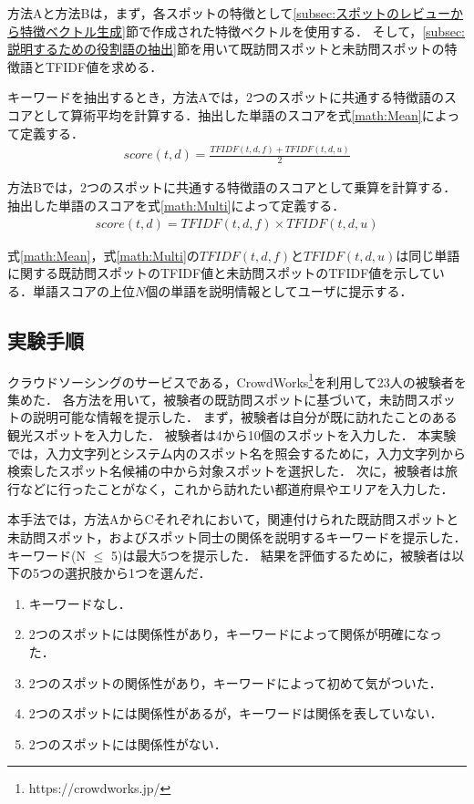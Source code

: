 \documentclass[submit]{ipsj}
\begin{document}
方法Aと方法Bは，まず，各スポットの特徴として\ref{subsec:スポットのレビューから特徴ベクトル生成}節で作成された特徴ベクトルを使用する．
そして，\ref{subsec:説明するための役割語の抽出}節を用いて既訪問スポットと未訪問スポットの特徴語とTFIDF値を求める．

キーワードを抽出するとき，方法Aでは，2つのスポットに共通する特徴語のスコアとして算術平均を計算する．抽出した単語のスコアを式\ref{math:Mean}によって定義する．
\begin{eqnarray}
  score(t,d) = \frac{TFIDF(t,d,f) + TFIDF(t,d,u)}{2}
  \label{math:Mean}
\end{eqnarray}

方法Bでは，2つのスポットに共通する特徴語のスコアとして乗算を計算する．抽出した単語のスコアを式\ref{math:Multi}によって定義する．
\begin{eqnarray}
  score(t,d) = TFIDF(t,d,f) \times TFIDF(t,d,u)
  \label{math:Multi}
\end{eqnarray}

式\ref{math:Mean}，式\ref{math:Multi}の$TFIDF(t,d,f)$と$TFIDF(t,d,u)$は同じ単語に関する既訪問スポットのTFIDF値と未訪問スポットのTFIDF値を示している．単語スコアの上位$N$個の単語を説明情報としてユーザに提示する．

\subsection{実験手順}
\label{subsec:実験手順}
クラウドソーシングのサービスである，CrowdWorks\footnote{https://crowdworks.jp/}を利用して23人の被験者を集めた．
各方法を用いて，被験者の既訪問スポットに基づいて，未訪問スポットの説明可能な情報を提示した．
まず，被験者は自分が既に訪れたことのある観光スポットを入力した．
被験者は4から10個のスポットを入力した．
本実験では，入力文字列とシステム内のスポット名を照会するために，入力文字列から検索したスポット名候補の中から対象スポットを選択した．
次に，被験者は旅行などに行ったことがなく，これから訪れたい都道府県やエリアを入力した．

本手法では，方法AからCそれぞれにおいて，関連付けられた既訪問スポットと未訪問スポット，およびスポット同士の関係を説明するキーワードを提示した．
キーワード(N $\le$ 5)は最大5つを提示した．
結果を評価するために，被験者は以下の5つの選択肢から1つを選んだ．
\begin{enumerate}
  \item キーワードなし．
  \item 2つのスポットには関係性があり，キーワードによって関係が明確になった．
  \item 2つのスポットの関係性があり，キーワードによって初めて気がついた．
  \item 2つのスポットには関係性があるが，キーワードは関係を表していない．
  \item 2つのスポットには関係性がない．
\end{enumerate}
\end{document}
